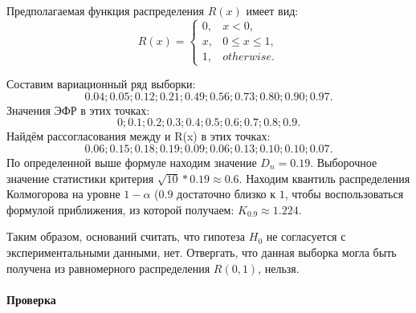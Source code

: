 \documentclass[11pt]{article}
\begin{document}
Предполагаемая функция распределения \(R(x)\) имеет вид: \[
R(x) = 
{
    \begin{cases}
        0, & x < 0, \\
        x, & 0 \leqslant x \leqslant 1, \\
        1, & otherwise.
    \end{cases}
}
\]

Составим вариационный ряд выборки: \[
0.04; 0.05; 0.12; 0.21; 0.49; 0.56; 0.73; 0.80; 0.90; 0.97.
\] Значения ЭФР в этих точках: \[
0; 0.1; 0.2; 0.3; 0.4; 0.5; 0.6; 0.7; 0.8; 0.9.
\] Найдём рассогласования между и R(x) в этих точках: \[
0.06; 0.15; 0.18; 0.19; 0.09; 0.06; 0.13; 0.10; 0.10; 0.07.
\] По определенной выше формуле находим значение \(D_n = 0.19\).
Выборочное значение статистики критерия
\(\sqrt{10} * 0.19 \approx 0.6\). Находим квантиль распределения
Колмогорова на уровне \(1 - \alpha\) (\(0.9\) достаточно близко к \(1\),
чтобы воспользоваться формулой приближения, из которой получаем:
\(K_{0.9} \approx 1.224\).

Таким образом, оснований считать, что гипотеза \(H_0\) не согласуется с
экспериментальными данными, нет. Отвергать, что данная выборка могла
быть получена из равномерного распределения \(R(0, 1)\), нельзя.

    \paragraph{Проверка}\label{ux43fux440ux43eux432ux435ux440ux43aux430}
\end{document}
